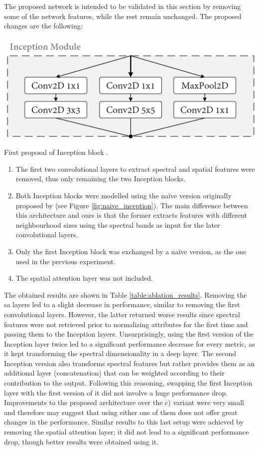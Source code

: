 The proposed network is intended to be validated in this section by removing some of the network features, while the rest remain unchanged. The proposed changes are the following:
\begin{marginfigure}[1.cm]
    \centering
    \includegraphics[width=\linewidth]{figs/vineyard_classification/inception_block.png}
	\caption{First proposal of Inception block \cite{szegedy_going_2014}.}
	\label{fig:naive_inception}
\end{marginfigure}
\begin{enumerate}
    \item The first two convolutional layers to extract spectral and spatial features were removed, thus only remaining the two Inception blocks.
    \item Both Inception blocks were modelled using the naïve version originally proposed by \cite{szegedy_going_2014} (see Figure \ref{fig:naive_inception}). The main difference between this architecture and ours is that the former extracts features with different neighbourhood sizes using the spectral bands as input for the later convolutional layers.
    \item Only the first Inception block was exchanged by a naïve version, as the one used in the previous experiment.
    \item The spatial attention layer was not included.
\end{enumerate}

The obtained results are shown in Table \ref{table:ablation_results}. Removing the \acrshort{sa} layers led to a slight decrease in performance, similar to removing the first convolutional layers. However, the latter returned worse results since spectral features were not retrieved prior to normalizing attributes for the first time and passing them to the Inception layers. Unsurprisingly, using the first version of the Inception layer twice led to a significant performance decrease for every metric, as it kept transforming the spectral dimensionality in a deep layer. The second Inception version also transforms spectral features but rather provides them as an additional layer (concatenation) that can be weighted according to their contribution to the output. Following this reasoning, swapping the first Inception layer with the first version of it did not involve a huge performance drop. Improvements to the proposed architecture over the c) variant were very small and therefore may suggest that using either one of them does not offer great changes in the performance. Similar results to this last setup were achieved by removing the spatial attention layer; it did not lead to a significant performance drop, though better results were obtained using it. 

